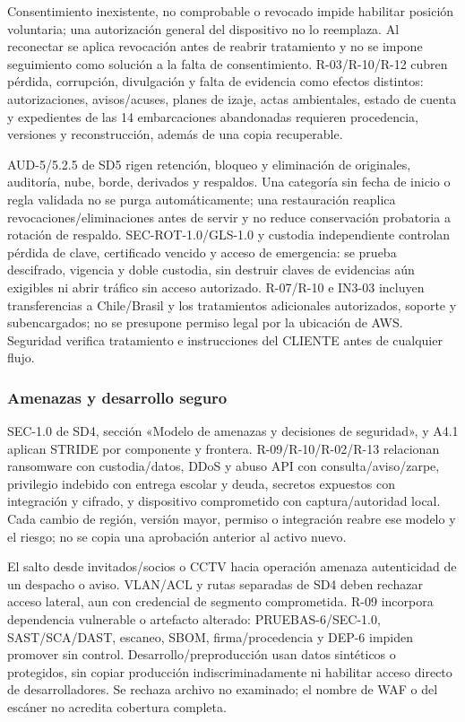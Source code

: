 Consentimiento inexistente, no comprobable o revocado impide habilitar posición voluntaria; una autorización general del dispositivo no lo reemplaza. Al reconectar se aplica revocación antes de reabrir tratamiento y no se impone seguimiento como solución a la falta de consentimiento. R-03/R-10/R-12 cubren pérdida, corrupción, divulgación y falta de evidencia como efectos distintos: autorizaciones, avisos/acuses, planes de izaje, actas ambientales, estado de cuenta y expedientes de las 14 embarcaciones abandonadas requieren procedencia, versiones y reconstrucción, además de una copia recuperable.

AUD-5/5.2.5 de SD5 rigen retención, bloqueo y eliminación de originales, auditoría, nube, borde, derivados y respaldos. Una categoría sin fecha de inicio o regla validada no se purga automáticamente; una restauración reaplica revocaciones/eliminaciones antes de servir y no reduce conservación probatoria a rotación de respaldo. SEC-ROT-1.0/GLS-1.0 y custodia independiente controlan pérdida de clave, certificado vencido y acceso de emergencia: se prueba descifrado, vigencia y doble custodia, sin destruir claves de evidencias aún exigibles ni abrir tráfico sin acceso autorizado. R-07/R-10 e IN3-03 incluyen transferencias a Chile/Brasil y los tratamientos adicionales autorizados, soporte y subencargados; no se presupone permiso legal por la ubicación de AWS. Seguridad verifica tratamiento e instrucciones del CLIENTE antes de cualquier flujo. \parencites[arts.~21, 23 y 85; pp.~15--17, 44]{sd8-ba}[RT-05.03/07; RT-07.10; RT-11.08--10; pp.~11--12, 18, 23]{sd8-bt}

\subsubsection{Amenazas y desarrollo seguro}
SEC-1.0 de SD4, sección «Modelo de amenazas y decisiones de seguridad», y A4.1 aplican STRIDE por componente y frontera. R-09/R-10/R-02/R-13 relacionan ransomware con custodia/datos, DDoS y abuso API con consulta/aviso/zarpe, privilegio indebido con entrega escolar y deuda, secretos expuestos con integración y cifrado, y dispositivo comprometido con captura/autoridad local. Cada cambio de región, versión mayor, permiso o integración reabre ese modelo y el riesgo; no se copia una aprobación anterior al activo nuevo.

El salto desde invitados/socios o CCTV hacia operación amenaza autenticidad de un despacho o aviso. VLAN/ACL y rutas separadas de SD4 deben rechazar acceso lateral, aun con credencial de segmento comprometida. R-09 incorpora dependencia vulnerable o artefacto alterado: PRUEBAS-6/SEC-1.0, SAST/SCA/DAST, escaneo, SBOM, firma/procedencia y DEP-6 impiden promover sin control. Desarrollo/preproducción usan datos sintéticos o protegidos, sin copiar producción indiscriminadamente ni habilitar acceso directo de desarrolladores. Se rechaza archivo no examinado; el nombre de WAF o del escáner no acredita cobertura completa.

